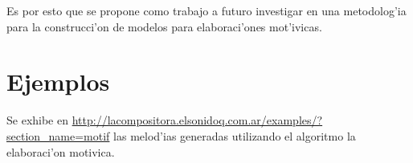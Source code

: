 Es por esto que se propone como trabajo a futuro investigar en una metodolog'ia para la construcci'on de modelos para elaboraci'ones mot'ivicas.


%
%
%
%
\section{Ejemplos}
Se exhibe en \url{http://lacompositora.elsonidoq.com.ar/examples/?section_name=motif} las melod'ias generadas utilizando
el algoritmo la elaboraci'on motivica.
